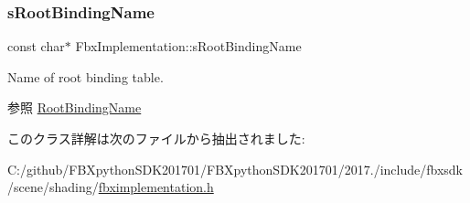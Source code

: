 \subsubsection{\texorpdfstring{s\+Root\+Binding\+Name}{sRootBindingName}}
{\footnotesize\ttfamily const char$\ast$ Fbx\+Implementation\+::s\+Root\+Binding\+Name\hspace{0.3cm}{\ttfamily [static]}}

Name of root binding table. \begin{DoxySeeAlso}{参照}
\hyperlink{class_fbx_implementation_a80df4effca2446b00f8925634c3d26aa}{Root\+Binding\+Name} 
\end{DoxySeeAlso}


このクラス詳解は次のファイルから抽出されました\+:\begin{DoxyCompactItemize}
\item 
C\+:/github/\+F\+B\+Xpython\+S\+D\+K201701/\+F\+B\+Xpython\+S\+D\+K201701/2017./include/fbxsdk/scene/shading/\hyperlink{fbximplementation_8h}{fbximplementation.\+h}\end{DoxyCompactItemize}
